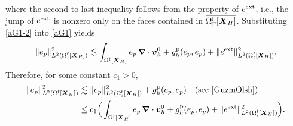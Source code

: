 \documentclass[11pt,reqno]{amsart}
\theoremstyle{definition}
\theoremstyle{plain}
\numberwithin{theorem}{section}
\numberwithin{proposition}{section}
\numberwithin{lemma}{section}
\numberwithin{equation}{section}
\newcommand{\bs}[1]{\boldsymbol{#1}}
\newcommand{\uu}[1]  {{\bs{#1}} }
\newcommand{\grad}   { \uu{\nabla}    }
\renewcommand{\(}{\bigl(}
\renewcommand{\)}{\bigr)}
\begin{document}
where the second-to-last inequality follows from the property of $e^{\rm ext}$, i.e., the jump of $e^{\rm ext}$ is nonzero only on the faces contained in $\overline{\Omega^{\rm f}_{\Gamma}[{\bs X}_H]}$. Substituting \eqref{aG1-2} into \eqref{aG1} yields
\begin{equation*}
\|e_p\|^2_{L^2(\Omega^{\rm f}_i[{\bs X}_H])} 
\lesssim 
\int_{\Omega^{\rm f}[{\bs X}_H]} e_p \,\grad\cdot {\bs v}_h^0 
+ g_h^{\rm p}(e_p,e_p) 
+ \|e^{\rm ext}\|_{L^2(\Omega^{\rm f}_i[{\bs X}_H])}^2 .
\end{equation*}
Therefore, for some constant $c_1>0$, 
\begin{align}\label{aG2}
\|e_p\|^2_{L^2(\Omega^{\rm f}[{\bs X}_H])} 
&\lesssim 
\|e_p\|^2_{L^2(\Omega^{\rm f}_i[{\bs X}_H])} + g_h^{\rm p}(e_p,e_p) \quad\mbox{(see \cite[inequality (4.2)]{GuzmOlsh})} \notag\\
&\le 
c_1 \Big( \int_{\Omega^{\rm f}[{\bs X}_H]} e_p \,\grad\cdot {\bs v}_h^0 
+ g_h^{\rm p}(e_p,e_p) 
+ \|e^{\rm ext}\|_{L^2(\Omega^{\rm f}_i[{\bs X}_H])}^2 \Big) .
\end{align}
\end{document}
